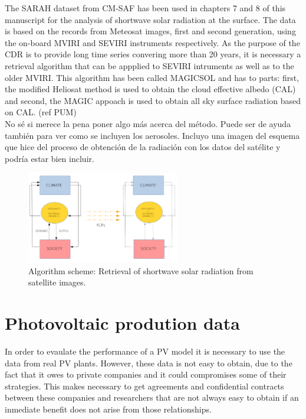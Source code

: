 The SARAH dataset from CM-SAF has been used in chapters 7 and 8 of this manuscript for the analysis of shortwave solar radiation at the surface. The data is based on the records from Meteosat images, first and second generation, using the on-board MVIRI and SEVIRI instruments respectively. As the purpose of the CDR is to provide long time series convering more than 20 years, it is necessary a retrieval algorithm that can be appplied to SEVIRI intruments as well as to the older MVIRI. This algorithm has been called MAGICSOL and has to parts: first, the modified Heliosat method is used to obtain the cloud effective albedo (CAL) and second, the MAGIC appoach is used to obtain all sky surface radiation based on CAL. (ref PUM)\\

{\color{red} No sé si merece la pena poner algo más acerca del método. Puede ser de ayuda también para ver como se incluyen los aerosoles. Incluyo una imagen del esquema que hice del proceso de obtención de la radiación con los datos del satélite y podría estar bien incluir.}\\


\begin{figure}
  \centering
  \includegraphics[width=0.6\textwidth]{figs/esquema}
  \caption{Algorithm scheme: Retrieval of shortwave solar radiation from satellite images.}
 \label{fig:algorithm_outline}
\end{figure}

\section{Photovoltaic prodution data}

In order to evaulate the performance of a PV model it is necessary to use the data from real PV plants. However, these data is not easy to obtain, due to the fact that it owes to private companies and it could compromises some of their strategies. This makes necessary to get agreements and confidential contracts between these companies and researchers that are not always easy to obtain if an inmediate benefit does not arise from those relationships.\\

